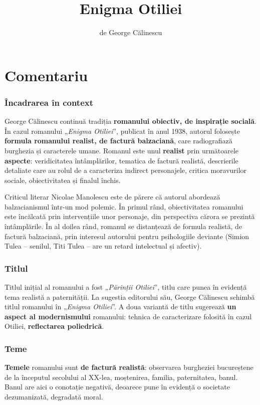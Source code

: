 \documentclass{article}
\title{Enigma Otiliei}
\author{de George Călinescu}
\date{}
\newcommand{\qu}[1]{„\emph{#1}”}
\begin{document}
\maketitle

\part*{Comentariu}
\section{Încadrarea în context}
George Călinescu continuă tradiția \textbf{romanului obiectiv, de inspirație socială}. În cazul romanului \qu{Enigma Otiliei}, publicat în anul 1938, autorul folosește \textbf{formula romanului realist, de factură balzaciană}, care radiografiază burghezia și caracterele umane. Romanul este unul \textbf{realist} prin următoarele \textbf{aspecte}: veridicitatea întâmplărilor, tematica de factură realistă, descrierile detaliate care au rolul de a caracteriza indirect personajele, critica moravurilor sociale, obiectivitatea și finalul închis.

Criticul literar Nicolae Manolescu este de părere că autorul abordează balzacianismul într-un mod polemic. În primul rând, obiectivitatea romanului este încălcată prin intervențiile unor personaje, din perspectiva cărora se prezintă întâmplările. În al doilea rând, romanul se distanțează de formula realistă, de factură balzaciană, prin interesul autorului pentru psihologiile deviante (Simion Tulea -- senilul, Titi Tulea -- are un retard intelectual și afectiv).
\section{Titlul}
Titlul inițial al romanului a fost \qu{Părinții Otiliei}, titlu care punea în evidență tema realistă a paternității. La sugestia editorului său, George Călinescu schimbă titlul romanului în \qu{Enigma Otiliei}. A doua variantă de titlu sugerează \textbf{un aspect al modernismului} romanului: tehnica de caracterizare folosită în cazul Otiliei, \textbf{reflectarea poliedrică}.
\section{Teme}
\textbf{Temele} romanului sunt \textbf{de factură realistă}: observarea burgheziei bucureștene de la începutul secolului al XX-lea, moștenirea, familia, paternitatea, banul. Banul are aici o conotație negativă, deoarece pune în evidență o societate dezumanizată, degradată moral.
\end{document}
